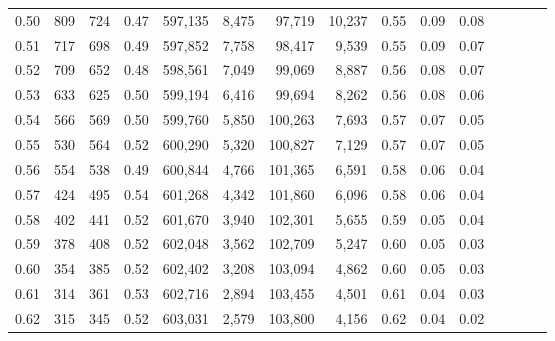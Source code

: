 \begin{tabular}{rrrcrrrrrrrrrrr}
0.50 &     809 &    724 &                                       0.47 &  597,135 &    8,475 &   97,719 &   10,237 &  0.55 &  0.09 &                         0.08 \\
0.51 &     717 &    698 &                                       0.49 &  597,852 &    7,758 &   98,417 &    9,539 &  0.55 &  0.09 &                         0.07 \\
0.52 &     709 &    652 &                                       0.48 &  598,561 &    7,049 &   99,069 &    8,887 &  0.56 &  0.08 &                         0.07 \\
0.53 &     633 &    625 &                                       0.50 &  599,194 &    6,416 &   99,694 &    8,262 &  0.56 &  0.08 &                         0.06 \\
0.54 &     566 &    569 &                                       0.50 &  599,760 &    5,850 &  100,263 &    7,693 &  0.57 &  0.07 &                         0.05 \\
0.55 &     530 &    564 &                                       0.52 &  600,290 &    5,320 &  100,827 &    7,129 &  0.57 &  0.07 &                         0.05 \\
0.56 &     554 &    538 &                                       0.49 &  600,844 &    4,766 &  101,365 &    6,591 &  0.58 &  0.06 &                         0.04 \\
0.57 &     424 &    495 &                                       0.54 &  601,268 &    4,342 &  101,860 &    6,096 &  0.58 &  0.06 &                         0.04 \\
0.58 &     402 &    441 &                                       0.52 &  601,670 &    3,940 &  102,301 &    5,655 &  0.59 &  0.05 &                         0.04 \\
0.59 &     378 &    408 &                                       0.52 &  602,048 &    3,562 &  102,709 &    5,247 &  0.60 &  0.05 &                         0.03 \\
0.60 &     354 &    385 &                                       0.52 &  602,402 &    3,208 &  103,094 &    4,862 &  0.60 &  0.05 &                         0.03 \\
0.61 &     314 &    361 &                                       0.53 &  602,716 &    2,894 &  103,455 &    4,501 &  0.61 &  0.04 &                         0.03 \\
0.62 &     315 &    345 &                                       0.52 &  603,031 &    2,579 &  103,800 &    4,156 &  0.62 &  0.04 &                         0.02 \\

\end{tabular}
